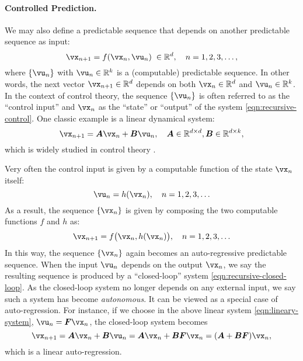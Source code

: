 \documentclass[../../book-main.tex]{subfiles}
\begin{document}
\paragraph{Controlled Prediction.}
We may also define a predictable sequence that depends on another predictable sequence as input:
\begin{equation}
    \vx_{n+1} = f(\vx_{n}, \vu_n) \; \in \mathbb{R}^d, \quad n =  1, 2, 3, \ldots,
\label{eqn:recursive-control}
\end{equation}
where $\{\vu_n\}$ with $\vu_n \in \mathbb{R}^k$ is a (computable) predictable sequence. In other words, the next vector $\vx_{n+1} \in \mathbb{R}^d$ depends on both $\vx_n \in \mathbb{R}^d$ and $\vu_n \in \mathbb{R}^k$. In the context of control theory, the sequence $\{\vu_n\}$ is often referred to as the ``control input'' and  $\vx_n$ as the ``state'' or ``output'' of the system \eqref{eqn:recursive-control}. One classic example is a linear dynamical system:
\begin{equation}
    \vx_{n+1} = \boldsymbol{A}\vx_n + \boldsymbol{B}\vu_n, \quad \boldsymbol{A} \in \mathbb{R}^{d\times d}, \boldsymbol{B} \in \mathbb{R}^{d\times k},
    \label{eqn:lineary-system} 
\end{equation}
which is widely studied in control theory \cite{Cal:Des}. 

Very often the control input is given by a computable function of the state $\vx_n$ itself: 
\begin{equation}
    \vu_n = h(\vx_n), \quad n =  1, 2, 3, \ldots 
\end{equation}
As a result, the sequence $\{\vx_n\}$ is given by composing the two computable functions $f$ and $h$ as:
\begin{equation}
    \vx_{n+1} = f\big(\vx_{n}, h(\vx_n)\big), \quad n =  1, 2, 3, \ldots
    \label{eqn:recursive-closed-loop}
\end{equation}
In this way, the sequence $\{\vx_n\}$ again becomes an auto-regressive predictable sequence.  When the input $\vu_n$ depends on the output $\vx_n$, we say the resulting sequence is produced by a ``closed-loop'' system \eqref{eqn:recursive-closed-loop}. As the closed-loop system no longer depends on any external input, we say such a system has become {\em autonomous}. It can be viewed as a special case of auto-regression. For instance, if we choose in the above linear system \eqref{eqn:lineary-system}, $\vu_n = \boldsymbol{F}\vx_n$, the closed-loop system becomes
\begin{equation}
        \vx_{n+1} = \boldsymbol{A}\vx_n + \boldsymbol{B}\vu_n = \boldsymbol{A}\vx_n + \boldsymbol{B}\boldsymbol{F}\vx_n = (\boldsymbol{A}+ \boldsymbol{B}\boldsymbol{F})\vx_n,
    \label{eqn:lineary-system-closed}
\end{equation}
which is a linear auto-regression. 
\end{document}

